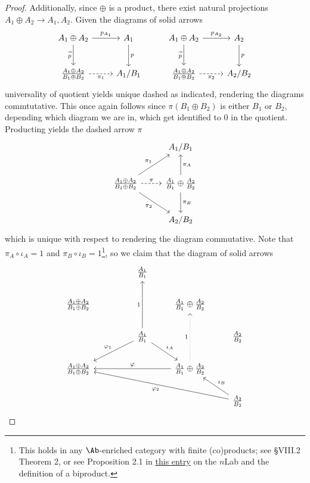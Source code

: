 \documentclass[11pt, letterpaper]{article}
\begin{document}
\begin{proof}
	Additionally, since $\oplus $ is a product, there exist natural projections $A_1\oplus A_2 \to A_1,A_2$. Given the diagrams of solid arrows
	\[\begin{tikzcd}[row sep = 2.5em, column sep = 2.5em]
	A_1\oplus A_2 \ar[" \widetilde{p}  "', d] \ar[" p_{A_1}  ", r]  & A_1 \ar[" p  ", d]  & A_1\oplus A_2 \ar[" p_{A_2}   ", r] \ar[" \widetilde{p} "', d]  & A_2 \ar[" p  ", d] \\
	\frac{A_1\oplus A_2}{B_1\oplus B_2} \ar[" \pi _1 "', dashed, r]  & A_1/B_1 & \frac{A_1\oplus A_2}{B_1\oplus B_2} \ar[" \pi _2 "', dashed, r]  & A_2/B_2
	\end{tikzcd}\]
	universality of quotient yields unique dashed as indicated, rendering the diagrams commtutative. This once again follows since $\pi (B_1 \oplus B_2)$ is either $B_1$ or $B_2$, depending which diagram we are in, which get identified to 0 in the quotient. Producting yields the dashed arrow $\pi $
	\[\begin{tikzcd}[row sep = 2.5em, column sep = 2.5em]
	 & A_1/B_1 \\
	\frac{A_1\oplus A_2}{B_1\oplus B_2} \ar[" \pi _1 ", ur] \ar[" \pi _2 "', dr] \ar[" \pi  ", dashed, r]  & \frac{A_1}{B_1} \oplus \frac{A_2}{B_2} \ar[" \pi_A  "', u] \ar[" \pi_B  ", d]  \\
	 & A_2/B_2
	\end{tikzcd}\]
	which is unique with respect to rendering the diagram commutative. Note that $\pi _A \circ \iota _A=1$ and $\pi _B \circ \iota _B=1$\footnote{This holds in any $\Ab $-enriched category with finite (co)products; see \cite{ml} \S VIII.2 Theorem 2, or see Proposition 2.1 in \href{https://ncatlab.org/nlab/show/additive+category}{this entry} on the $n$Lab and the definition of a biproduct.}, so we claim that the diagram of solid arrows
	\[\begin{tikzcd}
	&& {\frac{A_1}{B_1}} \\
	{\frac{A_1\oplus A_2}{B_1\oplus B_2}} &&& {\frac{A_1}{B_1}\oplus\frac{A_2}{B_2}} \\
	&& {\frac{A_1}{B_1}} && {\frac{A_2}{B_2}} \\
	{\frac{A_1\oplus A_2}{B_1\oplus B_2}} &&& {\frac{A_1}{B_1}\oplus\frac{A_2}{B_2}} \\
	&&&& {\frac{A_2}{B_2}}
	\arrow[dotted, " 1 ", from=4-4, to=2-4]
	\arrow[" \varphi_1 "', from=3-3, to=4-1]
	\arrow[" \iota _A ", from=3-3, to=4-4]
	\arrow[" 1 ",  from=3-3, to=1-3]
	\arrow[" \varphi  "', from=4-4, to=4-1]
	\arrow[" \iota _B "', from=5-5, to=4-4]
	\arrow[" \varphi _2 ", from=5-5, to=4-1]

\end{tikzcd}\]
\end{proof}
\end{document}

